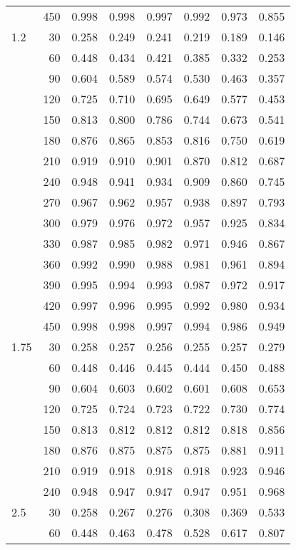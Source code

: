 \documentclass[bimj,fleqn]{w-art}\usepackage[]{graphicx}\usepackage[]{color}
\theoremstyle{plain}
\theoremstyle{definition}
\begin{document}
\begin{table}[ht]
\begin{tabular}{lrrrrrrr}
   & 450 & 0.998 & 0.998 & 0.997 & 0.992 & 0.973 & 0.855 \\ 
  1.2 & 30 & 0.258 & 0.249 & 0.241 & 0.219 & 0.189 & 0.146 \\ 
   & 60 & 0.448 & 0.434 & 0.421 & 0.385 & 0.332 & 0.253 \\ 
   & 90 & 0.604 & 0.589 & 0.574 & 0.530 & 0.463 & 0.357 \\ 
   & 120 & 0.725 & 0.710 & 0.695 & 0.649 & 0.577 & 0.453 \\ 
   & 150 & 0.813 & 0.800 & 0.786 & 0.744 & 0.673 & 0.541 \\ 
   & 180 & 0.876 & 0.865 & 0.853 & 0.816 & 0.750 & 0.619 \\ 
   & 210 & 0.919 & 0.910 & 0.901 & 0.870 & 0.812 & 0.687 \\ 
   & 240 & 0.948 & 0.941 & 0.934 & 0.909 & 0.860 & 0.745 \\ 
   & 270 & 0.967 & 0.962 & 0.957 & 0.938 & 0.897 & 0.793 \\ 
   & 300 & 0.979 & 0.976 & 0.972 & 0.957 & 0.925 & 0.834 \\ 
   & 330 & 0.987 & 0.985 & 0.982 & 0.971 & 0.946 & 0.867 \\ 
   & 360 & 0.992 & 0.990 & 0.988 & 0.981 & 0.961 & 0.894 \\ 
   & 390 & 0.995 & 0.994 & 0.993 & 0.987 & 0.972 & 0.917 \\ 
   & 420 & 0.997 & 0.996 & 0.995 & 0.992 & 0.980 & 0.934 \\ 
   & 450 & 0.998 & 0.998 & 0.997 & 0.994 & 0.986 & 0.949 \\ 
  1.75 & 30 & 0.258 & 0.257 & 0.256 & 0.255 & 0.257 & 0.279 \\ 
   & 60 & 0.448 & 0.446 & 0.445 & 0.444 & 0.450 & 0.488 \\ 
   & 90 & 0.604 & 0.603 & 0.602 & 0.601 & 0.608 & 0.653 \\ 
   & 120 & 0.725 & 0.724 & 0.723 & 0.722 & 0.730 & 0.774 \\ 
   & 150 & 0.813 & 0.812 & 0.812 & 0.812 & 0.818 & 0.856 \\ 
   & 180 & 0.876 & 0.875 & 0.875 & 0.875 & 0.881 & 0.911 \\ 
   & 210 & 0.919 & 0.918 & 0.918 & 0.918 & 0.923 & 0.946 \\ 
   & 240 & 0.948 & 0.947 & 0.947 & 0.947 & 0.951 & 0.968 \\ 
  2.5 & 30 & 0.258 & 0.267 & 0.276 & 0.308 & 0.369 & 0.533 \\ 
   & 60 & 0.448 & 0.463 & 0.478 & 0.528 & 0.617 & 0.807 \\ 

\end{tabular}
\end{table}
\end{document}
